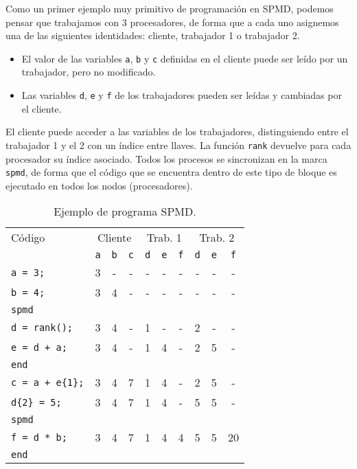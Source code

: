 \begin{ejemplo}
    Como un primer ejemplo muy primitivo de programación en SPMD, podemos pensar que trabajamos con 3 procesadores, de forma que a cada uno asignemos una de las siguientes identidades: cliente, trabajador 1 o trabajador 2.
    \begin{itemize}
        \item El valor de las variables \verb|a|, \verb|b| y \verb|c| definidas en el cliente puede ser leído por un trabajador, pero no modificado.
        \item Las variables \verb|d|, \verb|e| y \verb|f| de los trabajadores pueden ser leídas y cambiadas por el cliente.
    \end{itemize}
    El cliente puede acceder a las variables de los trabajadores, distinguiendo entre el trabajador 1 y el 2 con un índice entre llaves. La función \verb|rank| devuelve para cada procesador su índice asociado. Todos los procesos se sincronizan en la marca \verb|spmd|, de forma que el código que se encuentra dentro de este tipo de bloque es ejecutado en todos los nodos (procesadores).

    \begin{table}
    \centering
    \begin{tabular}{|l|ccc|ccc|ccc|}
        \hline
        Código & \multicolumn{3}{c|}{Cliente} & \multicolumn{3}{c|}{Trab. 1} & \multicolumn{3}{c|}{Trab. 2} \\
               & \verb|a| & \verb|b| & \verb|c| & \verb|d| & \verb|e| & \verb|f| & \verb|d| & \verb|e| & \verb|f| \\
        \hline
        \verb|a = 3;| & 3 & - & - & - & - & - & - & - & - \\
        \verb|b = 4;| & 3 & 4 & - & - & - & - & - & - & - \\
        \verb|spmd| &   &   &   &   &   &   &   &   &   \\
        \verb|d = rank();| & 3 & 4 & - & 1 & - & - & 2 & - & - \\
        \verb|e = d + a;| & 3 & 4 & - & 1 & 4 & - & 2 & 5 & - \\
        \verb|end| &   &   &   &   &   &   &   &   &   \\
        \verb|c = a + e{1};| & 3 & 4 & 7 & 1 & 4 & - & 2 & 5 & - \\
        \verb|d{2} = 5;| & 3 & 4 & 7 & 1 & 4 & - & 5 & 5 & - \\
        \verb|spmd| &   &   &   &   &   &   &   &   &   \\
        \verb|f = d * b;| & 3 & 4 & 7 & 1 & 4 & 4 & 5 & 5 & 20 \\
        \verb|end| &   &   &   &   &   &   &   &   &    \\
        \hline
    \end{tabular}
    \caption{Ejemplo de programa SPMD.}
    \end{table}
\end{ejemplo}

